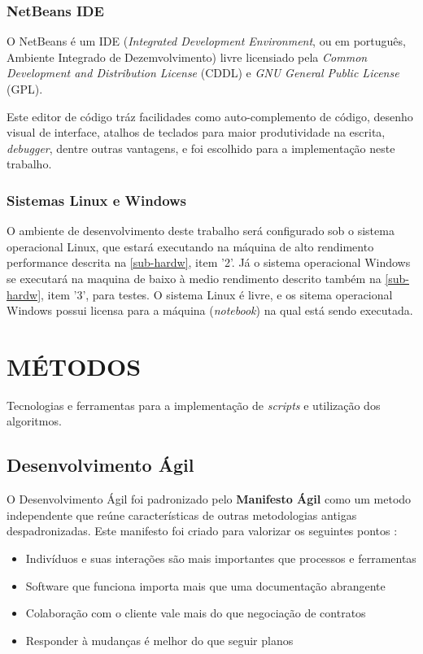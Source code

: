 \subsubsection{NetBeans IDE}\label{subsec:netbeans}
O NetBeans é um IDE (\textit{Integrated Development Environment}, ou em português, Ambiente Integrado de Dezemvolvimento) livre licensiado pela \textit{Common Development and Distribution License} (CDDL) e \textit{GNU General Public License} (GPL).

Este editor de código tráz facilidades como auto-complemento de código, desenho visual de interface, atalhos de teclados para maior produtividade na escrita, \textit{debugger}, dentre outras vantagens, e foi escolhido para a implementação neste trabalho.

\subsubsection{Sistemas Linux e Windows}\label{subsec:linux}
O ambiente de desenvolvimento deste trabalho será configurado sob o sistema operacional Linux, que estará executando na máquina de alto rendimento performance descrita na \autoref{sub-hardw}, item '2'. Já o sistema operacional Windows se executará na maquina de baixo à medio rendimento descrito também na \autoref{sub-hardw}, item '3', para testes. O sistema Linux é livre, e os sitema operacional Windows possui licensa para a máquina (\textit{notebook}) na qual está sendo executada.


\section{MÉTODOS}\label{sec:metodos}
Tecnologias e ferramentas para a implementação de \textit{scripts} e utilização dos algoritmos.

\subsection{Desenvolvimento Ágil}
O Desenvolvimento Ágil foi padronizado pelo \textbf{Manifesto Ágil} como um metodo independente que reúne características de outras metodologias antigas despadronizadas. Este manifesto foi criado para valorizar os seguintes pontos \cite{dev-agil}:

\begin{itemize}
	\item Indivíduos e suas interações são mais importantes que processos e ferramentas
	\item Software que funciona importa mais que uma documentação abrangente
	\item Colaboração com o cliente vale mais do que negociação de contratos
	\item Responder à mudanças é melhor do que seguir planos
\end{itemize}

